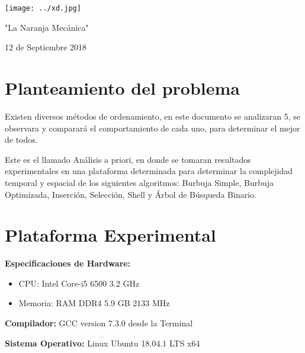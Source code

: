 \documentclass[12pt]{article}
\begin{document}
\begin{titlepage}
\begin{center}
					\begin{minipage}{0.5\textwidth}
					\begin{center} \large
						\texttt{[image: ../xd.jpg]}
						\caption*{"La Naranja Mecánica"}
					\end{center}
				\end{minipage}

				\vfill
				
				{\large 12 de Septiembre 2018}
			\end{center}
		\end{titlepage}
	
	\tableofcontents
	\newpage
	\section{Planteamiento del problema}
	
    Existen diversos métodos de ordenamiento, en este documento se analizaran 5, se observara y comparará
    el comportamiento de cada uno, para determinar el mejor de todos.
    
    Este es el llamado Análisis a priori, en donde se tomaran resultados experimentales en una plataforma determinada para determinar la complejidad temporal y espacial de los siguientes algoritmos: Burbuja Simple, Burbuja Optimizada, Inserción, Selección, Shell y Árbol de Búsqueda Binario.
	
    \section{Plataforma Experimental}
    \textbf{Especificaciones de Hardware:}
    \begin{itemize}
        \item CPU: Intel Core-i5 6500 3.2 GHz
        \item Memoria: RAM DDR4 5.9 GB 2133 MHz
    \end{itemize}
    
    \textbf{Compilador:} GCC version 7.3.0 desde la Terminal
    
    \textbf{Sistema Operativo:} Linux Ubuntu 18.04.1 LTS x64 

	
\end{document}
